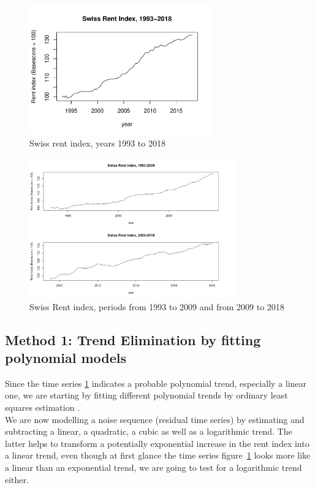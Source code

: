 \documentclass[11pt,a4paper]{article}
\begin{document}
\begin{figure}[!ht]
    \centering
    \includegraphics[angle=0,width=0.7\textwidth]{indiceloyers_timeseries}
    \caption{Swiss rent index, years 1993 to 2018}
    \label{fig:indiceloyers_timeseries}
\end{figure}
 
\begin{figure}[!htb]
    \centering
    \includegraphics[angle=0,width=0.8\textwidth]{indiceloyers_test_train}
    \caption{Swiss Rent index, periods from 1993 to 2009 and from 2009 to 2018}
    \label{fig:indiceloyers_test_train}
\end{figure}

\subsection{Method 1: Trend Elimination by fitting polynomial models}
Since the time series \ref{fig:indiceloyers_timeseries} indicates a probable polynomial trend, especially a linear one, we are starting by fitting different polynomial trends by ordinary least squares estimation \cite[p.~11]{htf09}.\\

We are now modelling a noise sequence (residual time series) by estimating and subtracting a linear, a quadratic, a cubic as well as a logarithmic trend. The latter  helps to transform a potentially exponential increase in the rent index into a linear trend, even though at first glance the time series figure~\ref{fig:indiceloyers_timeseries} looks more like a linear than an exponential trend, we are going to test for a logarithmic trend either.\\
\end{document}
